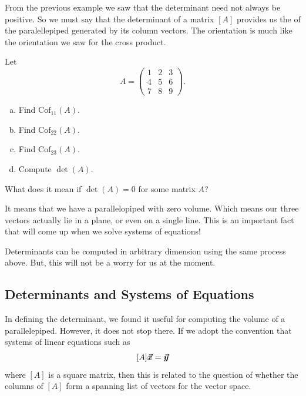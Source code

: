 From the previous example we saw that the determinant need not always be positive.  So we must say that the determinant of a matrix $[A]$ provides us the  of the paralellepiped generated by its column vectors. The orientation is much like the orientation we saw for the cross product.


        \begin{exercise} Let
        \[
        A=\begin{pmatrix} 1 & 2 & 3 \\ 4 & 5 & 6 \\ 7 & 8 & 9 \end{pmatrix}.
        \]
        \begin{enumerate}[(a)]
            \item Find $\textrm{Cof}_{11}(A)$.
            \item Find $\textrm{Cof}_{22}(A)$.
            \item Find $\textrm{Cof}_{23}(A)$.
            \item Compute $\det(A)$.
        \end{enumerate}
        
        \end{exercise}
        
        \begin{question}
        What does it mean if $\det(A)=0$ for some matrix $A$?
        \end{question}
        
        \begin{answer}
        It means that we have a parallelopiped with zero volume.  Which means our three vectors actually lie in a plane, or even on a single line.  This is an important fact that will come up when we solve systems of equations!
        \end{answer}
        
        \begin{remark}
        Determinants can be computed in arbitrary dimension using the same process above. But, this will not be a worry for us at the moment.
        \end{remark}
        
        \subsection{Determinants and Systems of Equations}
    
    In defining the determinant, we found it useful for computing the volume of a parallelepiped. However, it does not stop there. If we adopt the convention that systems of linear equations such as
    \[
    [A]\boldsymbol{\boldsymbol{\vec{x}}} = \boldsymbol{\boldsymbol{\vec{y}}}
    \]
    where $[A]$ is a square matrix, then this is related to the question of whether the columns of $[A]$ form a spanning list of vectors for the vector space. 
    
